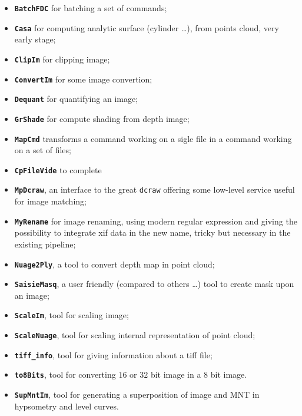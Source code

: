 \begin{itemize}
   \item {\tt \bf BatchFDC} for batching a set of commands;

   \item {\tt \bf Casa} for computing analytic surface (cylinder \dots),
                        from points cloud, very early stage;

   \item {\tt \bf ClipIm} for clipping image;

   \item {\tt \bf ConvertIm} for some image convertion;

   \item {\tt \bf Dequant} for quantifying an image;

   \item {\tt \bf GrShade} for compute shading from depth image;

   \item {\tt \bf MapCmd} transforms a command working on a sigle file in a command
         working on a set of files;

   \item {\tt \bf CpFileVide}   to complete

   \item {\tt \bf MpDcraw}, an interface to the great {\tt dcraw} offering some low-level
         service useful for image matching;

   \item {\tt \bf MyRename} for image renaming, using modern regular expression and giving the possibility
         to integrate xif data in the new name, tricky but necessary in the existing pipeline;

    \item {\tt \bf Nuage2Ply}, a tool to convert depth map in point cloud;

   \item {\tt \bf SaisieMasq}, a user friendly (compared to others \dots) tool to create
         mask upon an image;

   \item {\tt \bf ScaleIm}, tool for scaling image;

   \item {\tt \bf ScaleNuage}, tool for scaling internal representation of point cloud;

   \item {\tt \bf tiff\_info}, tool for giving information about a tiff file;

   \item {\tt \bf to8Bits}, tool for converting $16$ or $32$ bit image in a $8$ bit image.

   \item {\tt \bf SupMntIm}, tool for generating a superposition of image and MNT in hypsometry 
         and level curves.

\end{itemize}









